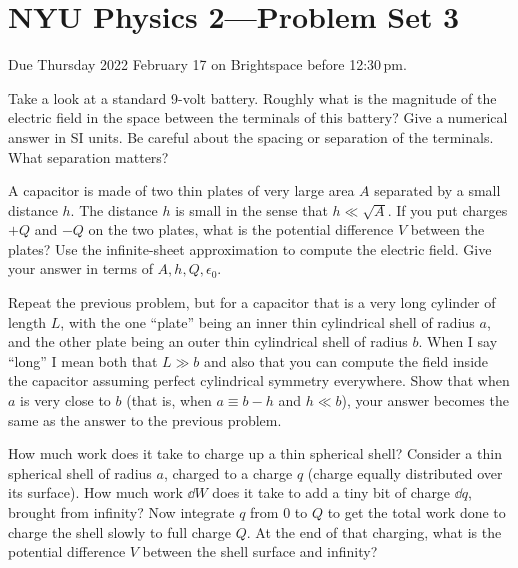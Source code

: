 \documentclass[12pt]{article}
\begin{document}
\section*{NYU Physics 2---Problem Set 3}

Due Thursday 2022 February 17 on Brightspace before 12:30\,pm.

\startproblem%
Take a look at a standard 9-volt battery.
Roughly what is the magnitude of the electric field in the space
between the terminals of this battery? Give a numerical answer in
SI units.
Be careful about the spacing or separation of the terminals.
What separation matters?

\startproblem%
A capacitor is made of two thin plates of very large area $A$
separated by a small distance $h$. The distance $h$ is small in the sense
that $h\ll \sqrt{A}$. If you put charges $+Q$ and $-Q$ on the
two plates, what is the potential difference $V$ between the plates?
Use the infinite-sheet approximation to compute the electric field.
Give your answer in terms of $A, h, Q, \epsilon_0$.

\startproblem%
Repeat the previous problem, but for a capacitor that is a very long
cylinder of length $L$, with the one ``plate'' being an inner thin
cylindrical shell of radius $a$, and the other plate being an outer
thin cylindrical shell of radius $b$. When I say ``long'' I mean both that
$L\gg b$ and also that you
can compute the field inside the capacitor assuming perfect
cylindrical symmetry everywhere. Show that when $a$ is very close to $b$ (that
is, when $a \equiv b - h$ and $h \ll b$), your answer becomes the same
as the answer to the previous problem.

\startproblem%
How much work does it take to charge up a thin spherical shell?
Consider a thin spherical shell of radius $a$, charged to a charge
$q$ (charge equally distributed over its surface). How much work
$\dd W$ does it take to add a tiny bit of charge $\dd q$, brought
from infinity? Now integrate $q$ from $0$ to $Q$ to get the total
work done to charge the shell slowly to full charge $Q$. At the
end of that charging, what is the potential difference $V$ between
the shell surface and infinity?
\end{document}
